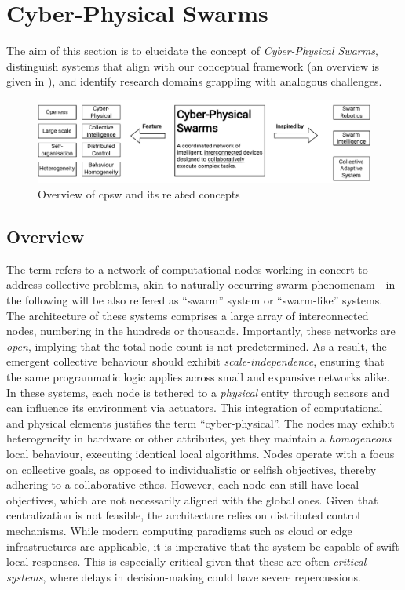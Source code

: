 \chapter{Cyber-Physical Swarms}\label{chap:cpsw}\mtcaddchapter
\minitoc%
The aim of this section is to elucidate the concept of \textit{Cyber-Physical Swarms}, 
 distinguish systems that align with our conceptual framework (an overview is given in ), 
 and identify research domains grappling with analogous challenges. 
% 
\begin{figure}
    \includegraphics[width=\textwidth]{chapters/img/cyber-physical-swarms-overview.drawio.pdf}
    \caption{Overview of \acf{cpsw} and its related concepts}\label{fig:overview-cpsw}
\end{figure}
\section{Overview}
The term refers to a network of computational nodes working in concert to address collective problems, 
 akin to naturally occurring swarm phenomenam---in the following will be also reffered as ``swarm'' system or ``swarm-like'' systems.
%
The architecture of these systems comprises a large array of interconnected nodes, 
 numbering in the hundreds or thousands. 
% 
Importantly, these networks are \textit{open}, 
 implying that the total node count is not predetermined. 
% 
As a result, 
 the emergent collective behaviour should exhibit \textit{scale-independence}, 
 ensuring that the same programmatic logic applies across small and expansive networks alike.
%
In these systems, each node is tethered to a \textit{physical} entity through sensors and can influence its environment via actuators. 
 This integration of computational and physical elements justifies the term ``cyber-physical''. 
 The nodes may exhibit heterogeneity in hardware or other attributes, 
 yet they maintain a \emph{homogeneous} local behaviour, executing identical local algorithms.
%
Nodes operate with a focus on collective goals, 
 as opposed to individualistic or selfish objectives, 
 thereby adhering to a collaborative ethos.
%
However, each node can still have local objectives, 
 which are not necessarily aligned with the global ones.
% 
Given that centralization is not feasible, 
 the architecture relies on distributed control mechanisms. 
 While modern computing paradigms such as cloud or edge infrastructures are applicable, 
 it is imperative that the system be capable of swift local responses. 
 This is especially critical given that these are often \emph{critical systems}, 
 where delays in decision-making could have severe repercussions.

